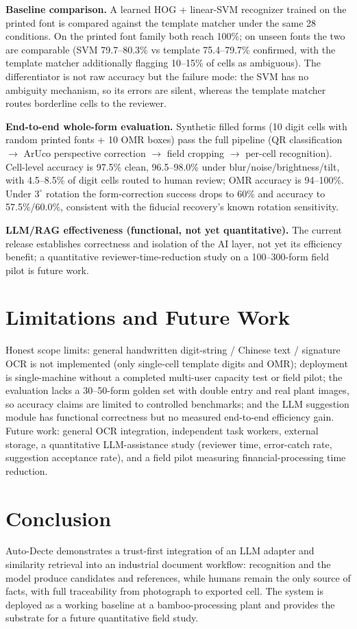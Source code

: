 \documentclass[conference]{IEEEtran}
\begin{document}
\textbf{Baseline comparison.} A learned HOG + linear-SVM recognizer trained on the printed font is compared against the template matcher under the same 28 conditions. On the printed font family both reach 100\%; on unseen fonts the two are comparable (SVM 79.7--80.3\% vs template 75.4--79.7\% confirmed, with the template matcher additionally flagging 10--15\% of cells as ambiguous). The differentiator is not raw accuracy but the failure mode: the SVM has no ambiguity mechanism, so its errors are silent, whereas the template matcher routes borderline cells to the reviewer.

\textbf{End-to-end whole-form evaluation.} Synthetic filled forms (10 digit cells with random printed fonts + 10 OMR boxes) pass the full pipeline (QR classification $\rightarrow$ ArUco perspective correction $\rightarrow$ field cropping $\rightarrow$ per-cell recognition). Cell-level accuracy is 97.5\% clean, 96.5--98.0\% under blur/noise/brightness/tilt, with 4.5--8.5\% of digit cells routed to human review; OMR accuracy is 94--100\%. Under $3^\circ$ rotation the form-correction success drops to 60\% and accuracy to 57.5\%/60.0\%, consistent with the fiducial recovery's known rotation sensitivity.

\textbf{LLM/RAG effectiveness (functional, not yet quantitative).} The current release establishes correctness and isolation of the AI layer, not yet its efficiency benefit; a quantitative reviewer-time-reduction study on a 100--300-form field pilot is future work.

\section{Limitations and Future Work}
Honest scope limits: general handwritten digit-string / Chinese text / signature OCR is not implemented (only single-cell template digits and OMR); deployment is single-machine without a completed multi-user capacity test or field pilot; the evaluation lacks a 30--50-form golden set with double entry and real plant images, so accuracy claims are limited to controlled benchmarks; and the LLM suggestion module has functional correctness but no measured end-to-end efficiency gain. Future work: general OCR integration, independent task workers, external storage, a quantitative LLM-assistance study (reviewer time, error-catch rate, suggestion acceptance rate), and a field pilot measuring financial-processing time reduction.

\section{Conclusion}
Auto-Decte demonstrates a trust-first integration of an LLM adapter and similarity retrieval into an industrial document workflow: recognition and the model produce candidates and references, while humans remain the only source of facts, with full traceability from photograph to exported cell. The system is deployed as a working baseline at a bamboo-processing plant and provides the substrate for a future quantitative field study.
\end{document}
